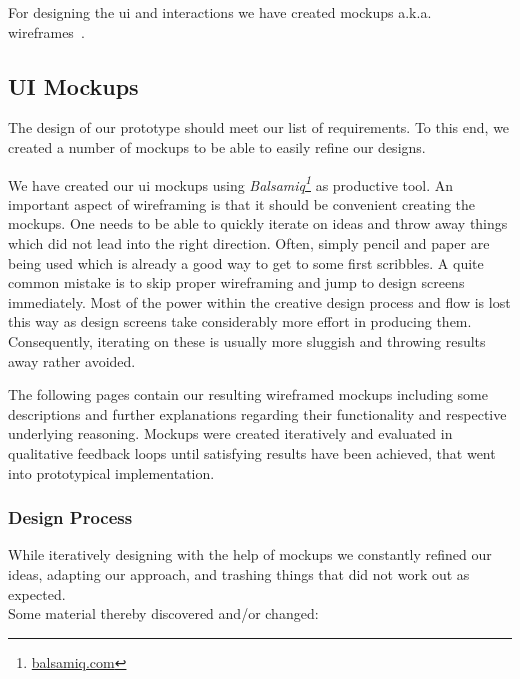 For designing the \gls{ui} and interactions we have created mockups a.k.a. wireframes~\cite{Garrett2011}.

\subsection{UI Mockups}

The design of our prototype should meet our list of requirements. To this end, we created a number of mockups to be able to easily refine our designs.

We have created our \gls{ui} mockups using \emph{Balsamiq\footnote{\textcolor{blue}{\href{https://balsamiq.com/}{balsamiq.com}}}} as productive tool.
An important aspect of wireframing is that it should be convenient creating the mockups.
One needs to be able to quickly iterate on ideas and throw away things which did not lead into the right direction.
Often, simply pencil and paper are being used which is already a good way to get to some first scribbles.
A quite common mistake is to skip proper wireframing and jump to design screens immediately.
Most of the power within the creative design process and flow is lost this way as design screens take considerably more effort in producing them.
Consequently, iterating on these is usually more sluggish and throwing results away rather avoided.

The following pages contain our resulting wireframed mockups including some descriptions and further explanations regarding their functionality and respective underlying reasoning.
Mockups were created iteratively and evaluated in qualitative feedback loops until satisfying results have been achieved, that went into prototypical implementation.

\subsubsection{Design Process}

While iteratively designing with the help of mockups we constantly refined our ideas, adapting our approach, and trashing things that did not work out as expected.\\
Some material thereby discovered and/or changed:


